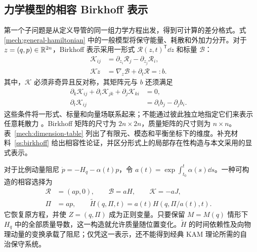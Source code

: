 \subsection{力学模型的相容 Birkhoff 表示}
\label{struct:birkhoff-section}

第一个子问题是从定义导管的同一组力学方程出发，得到可计算的差分格式。式 \eqref{mech:general-hamiltonian} 中的一般模型将保守能量、耗散和外加力分开。对于 $z=(q,p)\in\mathbb R^{2n}$，Birkhoff 表示采用一形式 $\mathcal R(z,t)^{\mathsf T}\dd z$ 和标量 $\mathcal B$：
\begin{equation}\label{struct:birkhoff}
\begin{aligned}
 \mathcal K_{ij}&=\partial_{z_i}\mathcal R_j-
                  \partial_{z_j}\mathcal R_i,\\
 \mathcal K\dot z&=\nabla_z\mathcal B+\partial_t\mathcal R=:b.
\end{aligned}
\end{equation}
其中，$\mathcal K$ 必须非奇异且反对称，其矩阵元与 $b$ 还须满足
\begin{equation}\label{struct:compatibility}
\begin{aligned}
 \partial_k\mathcal K_{ij}+\partial_i\mathcal K_{jk}
                +\partial_j\mathcal K_{ki}&=0,\\
 \partial_t\mathcal K_{ij}&=\partial_i b_j-\partial_j b_i.
\end{aligned}
\end{equation}
这些条件将一形式、标量和向量场联系起来；不能通过彼此独立地指定它们来表示任意耗散力 \citep{su2007}。Birkhoff 矩阵的尺寸为 $2n\times2n$，质量矩阵的尺寸则为 $n\times n$。表~\ref{mech:dimension-table} 列出了有限元、模态和平衡坐标下的维度。补充材料~\ref{ss:birkhoff} 给出相容性论证，并区分形式上的局部存在性构造与本文采用的显式表示。

对于比例动量阻尼 $\dot p=-H_q-\alpha(t)p$，令 $a(t)=\exp\!\int_{t_0}^{t}\alpha(s)\dd s$。一种可构造的相容选择为
\begin{equation}\label{struct:weighted-hamiltonian}
\begin{aligned}
 \mathcal R&=(a p,0),\qquad \mathcal B=aH,
       \qquad\mathcal K=-aJ,\\
 \Pi&=a p,\qquad
 \widetilde H(q,\Pi,t)=a(t)H(q,\Pi/a(t),t).
\end{aligned}
\end{equation}
它恢复原方程，并使 $Z=(q,\Pi)$ 成为正则变量。只要保留 $M=M(q)$ 情形下 $H_q$ 中的全部质量导数，这一构造就允许质量随位置变化。$\widetilde H$ 的时间依赖性及向物理动量的变换承载了阻尼；仅凭这一表示，还不能得到经典 KAM 理论所需的自治保守系统。

